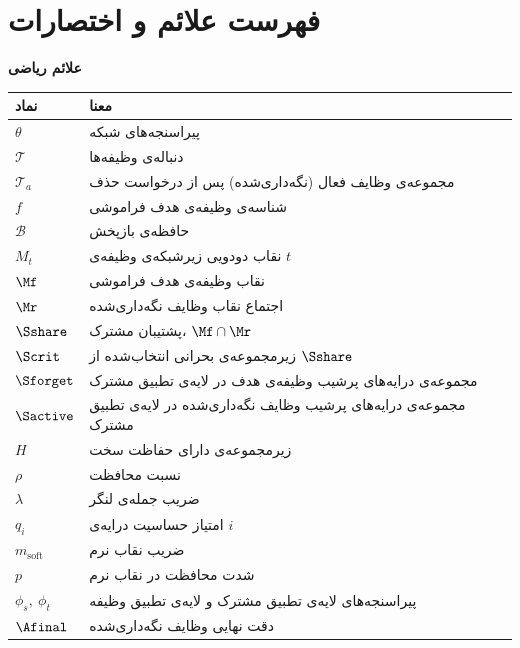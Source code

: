 \clearpage
{}
{}
\chapter*{فهرست علائم و اختصارات}

\noindent\textbf{علائم ریاضی}
\medskip

\begin{tabular}{p{3.0cm} p{10.4cm}}
\toprule
\textbf{نماد} & \textbf{معنا} \\ \midrule
$\theta$              & پیراسنجه‌های شبکه \\
$\mathcal{T}$         & دنباله‌ی وظیفه‌ها \\
$\mathcal{T}_a$       & مجموعه‌ی وظایف فعال (نگه‌داری‌شده) پس از درخواست حذف \\
$f$                   & شناسه‌ی وظیفه‌ی هدف فراموشی \\
$\mathcal{B}$         & حافظه‌ی بازپخش \\
$M_t$                 & نقاب دودویی زیرشبکه‌ی وظیفه‌ی $t$ \\
$\Mf$                 & نقاب وظیفه‌ی هدف فراموشی \\
$\Mr$                 & اجتماع نقاب وظایف نگه‌داری‌شده \\
$\Sshare$             & پشتیبان مشترک، $\Mf\cap\Mr$ \\
$\Scrit$              & زیرمجموعه‌ی بحرانی انتخاب‌شده از $\Sshare$ \\
$\Sforget$            & مجموعه‌ی درایه‌های پرشیب وظیفه‌ی هدف در لایه‌ی تطبیق مشترک \\
$\Sactive$            & مجموعه‌ی درایه‌های پرشیب وظایف نگه‌داری‌شده در لایه‌ی تطبیق مشترک \\
$H$                   & زیرمجموعه‌ی دارای حفاظت سخت \\
$\rho$                & نسبت محافظت \\
$\lambda$             & ضریب جمله‌ی لنگر \\
$q_i$                 & امتیاز حساسیت درایه‌ی $i$ \\
$m_{\mathrm{soft}}$   & ضریب نقاب نرم \\
$p$                   & شدت محافظت در نقاب نرم \\
$\phi_s,\ \phi_t$     & پیراسنجه‌های لایه‌ی تطبیق مشترک و لایه‌ی تطبیق وظیفه \\
$\Afinal$             & دقت نهایی وظایف نگه‌داری‌شده \\

\end{tabular}
